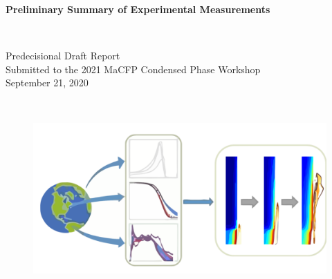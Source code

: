 \documentclass{book}
\begin{document}

\thispagestyle{empty}


\vspace*{0.75in}

\begin{center}
\begin{Large}
{\bf Preliminary Summary of Experimental Measurements} \\
\end{Large}
\hspace{1in} \\
\end{center}

\begin{center}
\begin{large}
Predecisional Draft Report\\
Submitted to the 2021 MaCFP Condensed Phase Workshop \\
September 21, 2020 \\
\end{large}
\hspace{2in} \\
\end{center}

\begin{figure}[h]
  \centering
  \includegraphics[width=6in]{FIGURES/MaCFP_Logo}
  \label{Cover_Image}
\end{figure}

\vfill
\end{document}
